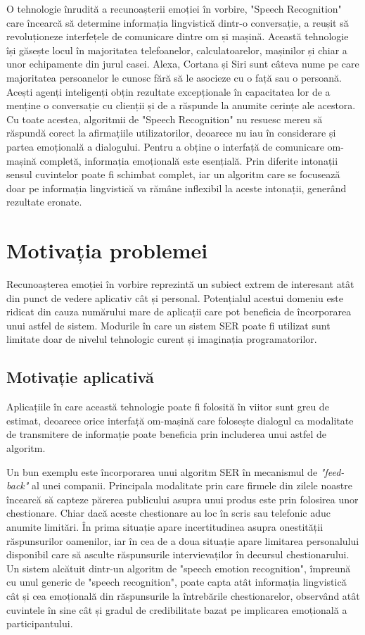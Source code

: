 \documentclass[a4paper,12pt]{book}
\begin{document}
				O tehnologie înrudită a recunoașterii emoției în vorbire, "Speech Recognition" care încearcă să determine informația lingvistică dintr-o conversație, a reușit să revoluționeze interfețele de comunicare dintre om și mașină. Această tehnologie își găsește locul în majoritatea telefoanelor, calculatoarelor, mașinilor și chiar a unor echipamente din jurul casei. Alexa, Cortana și Siri sunt câteva nume pe care majoritatea persoanelor le cunosc fără să le asocieze cu o față sau o persoană. Acești agenți inteligenți obțin rezultate excepționale în capacitatea lor de a menține o conversație cu clienții și de a răspunde la anumite cerințe ale acestora. Cu toate acestea, algoritmii de "Speech Recognition" nu resuesc mereu să răspundă corect la afirmațiile utilizatorilor, deoarece nu iau în considerare și partea emoțională a dialogului. Pentru a obține o interfață de comunicare om-mașină completă, informația emoțională este esențială. Prin diferite intonații sensul cuvintelor poate fi schimbat complet, iar un algoritm care se focusează doar pe informația lingvistică va rămâne inflexibil la aceste intonații, generând rezultate eronate. \par
					

		\section{Motivația problemei}
		Recunoașterea emoției în vorbire reprezintă un subiect extrem de interesant atât din punct de vedere aplicativ cât și personal. Potențialul acestui domeniu este ridicat din cauza numărului mare de aplicații care pot beneficia de încorporarea unui astfel de sistem. Modurile în care un sistem SER poate fi utilizat sunt limitate doar de nivelul tehnologic curent și imaginația programatorilor.
			\subsection{Motivație aplicativă}				
					Aplicațiile în care această tehnologie poate fi folosită în viitor sunt greu de estimat, deoarece orice interfață om-mașină care folosește dialogul ca modalitate de transmitere de informație poate beneficia prin includerea unui astfel de algoritm.\par
					
					Un bun exemplu este încorporarea unui algoritm SER în mecanismul de \textit{"feed-back"} al unei companii. Principala modalitate prin care firmele din zilele noastre încearcă să capteze părerea publicului asupra unui produs este prin folosirea unor chestionare. Chiar dacă aceste chestionare au loc în scris sau telefonic aduc anumite limitări. În prima situație apare incertitudinea asupra onestității răspunsurilor oamenilor, iar în cea de a doua situație apare limitarea personalului disponibil care să asculte răspunsurile intervievaților în decursul chestionarului. Un sistem alcătuit dintr-un algoritm de "speech emotion recognition", împreună cu unul generic de "speech recognition", poate capta atât informația lingvistică cât și cea emoțională din răspunsurile la întrebările chestionarelor, observând atât cuvintele în sine cât și gradul de credibilitate bazat pe implicarea emoțională a participantului. \par
					
\end{document}
